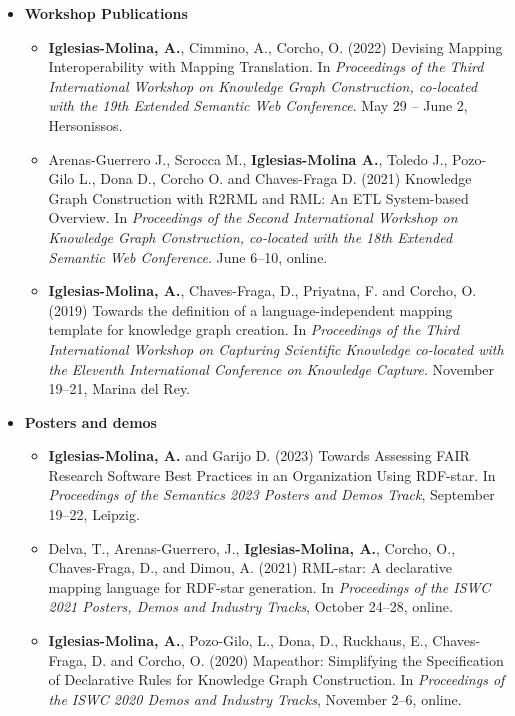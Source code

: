 \begin{itemize}
    \item \textbf{Workshop Publications}
    \begin{itemize}
        \item \textbf{Iglesias-Molina, A.}, Cimmino, A., Corcho, O. (2022) Devising Mapping Interoperability with Mapping Translation. In \textit{Proceedings of the Third International Workshop on Knowledge Graph Construction, co-located with the 19th Extended Semantic Web Conference}. May 29 -- June 2, Hersonissos. 
    
        \item Arenas-Guerrero J., Scrocca M., \textbf{Iglesias-Molina A.}, Toledo J., Pozo-Gilo L., Dona D., Corcho O. and Chaves-Fraga D. (2021) Knowledge Graph Construction with R2RML and RML: An ETL System-based Overview. In \textit{Proceedings of the Second International Workshop on Knowledge Graph Construction, co-located with the 18th Extended Semantic Web Conference}. June 6--10, online.
        
        \item \textbf{Iglesias-Molina, A.}, Chaves-Fraga, D., Priyatna, F. and Corcho, O. (2019) Towards the definition of a language-independent mapping template for knowledge graph creation. In \textit{Proceedings of the Third International Workshop on Capturing Scientific Knowledge co-located with the Eleventh International Conference on Knowledge Capture}. November 19--21, Marina del Rey.
    \end{itemize}
\end{itemize}

\begin{itemize}
    \item \textbf{Posters and demos}
    \begin{itemize}
        \item \textbf{Iglesias-Molina, A.} and Garijo D. (2023) Towards Assessing FAIR Research Software Best Practices in an Organization Using RDF-star. In \textit{Proceedings of the Semantics 2023 Posters and Demos Track}, September 19--22, Leipzig.
        
        \item Delva, T., Arenas-Guerrero, J., \textbf{Iglesias-Molina, A.}, Corcho, O., Chaves-Fraga, D., and Dimou, A. (2021) RML-star: A declarative mapping language for RDF-star generation. In \textit{Proceedings of the ISWC 2021 Posters, Demos and Industry Tracks}, October 24--28, online.
    
        \item \textbf{Iglesias-Molina, A.}, Pozo-Gilo, L., Dona, D., Ruckhaus, E., Chaves-Fraga, D. and Corcho, O. (2020) Mapeathor: Simplifying the Specification of Declarative Rules for Knowledge Graph Construction. In \textit{Proceedings of the ISWC 2020 Demos and Industry Tracks}, November 2--6, online.
    \end{itemize}
\end{itemize}


